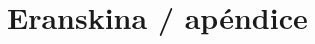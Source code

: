 \documentclass[a4page, 11pt, showtrims]{memoir}
\begin{document}

\backmatter
\appendix

\chapter{Eranskina / apéndice} \label{ch:eranskina}





\end{document}
